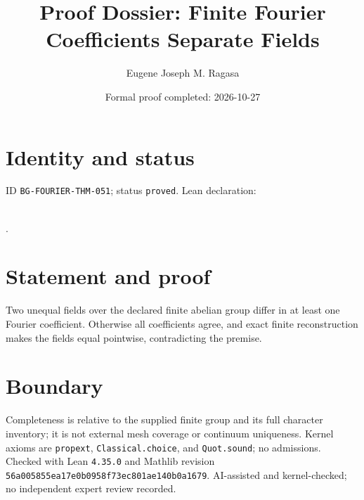 \documentclass[11pt]{article}
\title{Proof Dossier: Finite Fourier Coefficients Separate Fields}\author{Eugene Joseph M. Ragasa}\date{Formal proof completed: 2026-10-27}
\begin{document}
\maketitle
\section{Identity and status}
ID \texttt{BG-FOURIER-THM-051}; status \texttt{proved}. Lean declaration:
\par{}\\
{\tiny{}}.
\section{Statement and proof}
Two unequal fields over the declared finite abelian group differ in at least one Fourier
coefficient. Otherwise all coefficients agree, and exact finite reconstruction makes the
fields equal pointwise, contradicting the premise.
\section{Boundary}
Completeness is relative to the supplied finite group and its full character inventory; it
is not external mesh coverage or continuum uniqueness. Kernel axioms are \texttt{propext},
\texttt{Classical.choice}, and \texttt{Quot.sound}; no admissions. Checked with Lean
\texttt{4.35.0} and Mathlib revision
\texttt{56a005855ea17e0b0958f73ec801ae140b0a1679}. AI-assisted and kernel-checked;
no independent expert review recorded.
\end{document}
